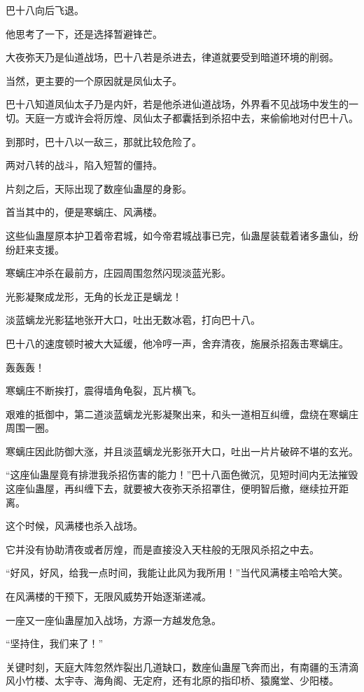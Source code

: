 \begin{this_body}
巴十八向后飞退。

他思考了一下，还是选择暂避锋芒。

大夜弥天乃是仙道战场，巴十八若是杀进去，律道就要受到暗道环境的削弱。

当然，更主要的一个原因就是凤仙太子。

巴十八知道凤仙太子乃是内奸，若是他杀进仙道战场，外界看不见战场中发生的一切。天庭一方或许会将厉煌、凤仙太子都囊括到杀招中去，来偷偷地对付巴十八。

到那时，巴十八以一敌三，那就比较危险了。

两对八转的战斗，陷入短暂的僵持。

片刻之后，天际出现了数座仙蛊屋的身影。

首当其中的，便是寒螭庄、风满楼。

这些仙蛊屋原本护卫着帝君城，如今帝君城战事已完，仙蛊屋装载着诸多蛊仙，纷纷赶来支援。

寒螭庄冲杀在最前方，庄园周围忽然闪现淡蓝光影。

光影凝聚成龙形，无角的长龙正是螭龙！

淡蓝螭龙光影猛地张开大口，吐出无数冰雹，打向巴十八。

巴十八的速度顿时被大大延缓，他冷哼一声，舍弃清夜，施展杀招轰击寒螭庄。

轰轰轰！

寒螭庄不断挨打，震得墙角龟裂，瓦片横飞。

艰难的抵御中，第二道淡蓝螭龙光影凝聚出来，和头一道相互纠缠，盘绕在寒螭庄周围一圈。

寒螭庄因此防御大涨，并且淡蓝螭龙光影张开大口，吐出一片片破碎不堪的玄光。

“这座仙蛊屋竟有排泄我杀招伤害的能力！”巴十八面色微沉，见短时间内无法摧毁这座仙蛊屋，再纠缠下去，就要被大夜弥天杀招罩住，便明智后撤，继续拉开距离。

这个时候，风满楼也杀入战场。

它并没有协助清夜或者厉煌，而是直接没入天柱般的无限风杀招之中去。

“好风，好风，给我一点时间，我能让此风为我所用！”当代风满楼主哈哈大笑。

在风满楼的干预下，无限风威势开始逐渐递减。

一座又一座仙蛊屋加入战场，方源一方越发危急。

“坚持住，我们来了！”

关键时刻，天庭大阵忽然炸裂出几道缺口，数座仙蛊屋飞奔而出，有南疆的玉清滴风小竹楼、太宇寺、海角阁、无定府，还有北原的指印桥、猿魔堂、少阳楼。


\end{this_body}
